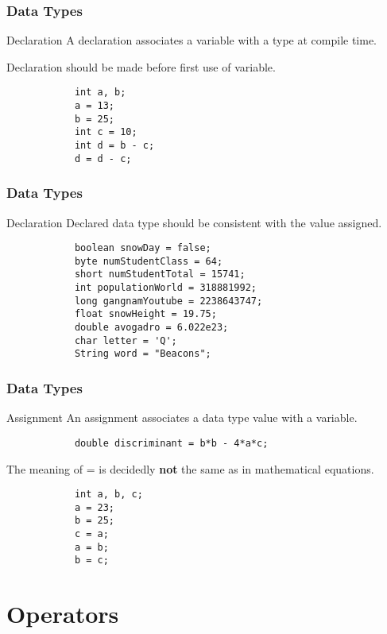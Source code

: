 \documentclass[10pt, compress]{beamer}
\begin{document}
\begin{frame}[fragile]
	\frametitle{Data Types}
	\begin{block}{Declaration}
		A declaration associates a variable with a type at compile time.

		Declaration should be made before first use of variable.
		\begin{verbatim}
			int a, b;
			a = 13;
			b = 25;
			int c = 10;
			int d = b - c;
			d = d - c;
		\end{verbatim}
	\end{block}
\end{frame}

\begin{frame}[fragile]
	\frametitle{Data Types}
	\begin{block}{Declaration}
		Declared data type should be consistent with the value assigned.
		\begin{verbatim}
			boolean snowDay = false;
			byte numStudentClass = 64;
			short numStudentTotal = 15741;
			int populationWorld = 318881992;
			long gangnamYoutube = 2238643747;
			float snowHeight = 19.75;
			double avogadro = 6.022e23;
			char letter = 'Q';
			String word = "Beacons";
		\end{verbatim}
	\end{block}
\end{frame}

\begin{frame}[fragile]
	\frametitle{Data Types}
	\begin{block}{Assignment}
		An assignment associates a data type value with a variable.
		\begin{verbatim}
			double discriminant = b*b - 4*a*c;
		\end{verbatim}
		The meaning of = is decidedly \textbf{not} the same as in mathematical equations.
		\begin{verbatim}
			int a, b, c;
			a = 23;
			b = 25;
			c = a;
			a = b;
			b = c;
		\end{verbatim}
	\end{block}
\end{frame}

\section{Operators}
\end{document}

